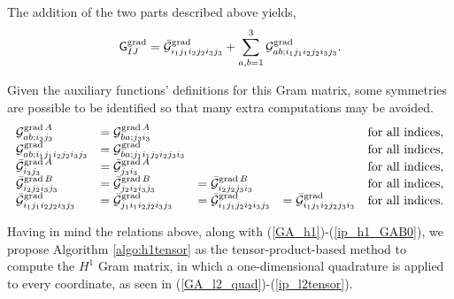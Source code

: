 The addition of the two parts described above yields,
% 
\begin{equation}
    \mathsf{G}^{\operatorname{grad}}_{IJ}=\bar{\mathcal{G}}_{i_1j_1i_2j_2i_3j_3}^{\operatorname{grad}}+\sum\limits_{a,b=1}^3\mathcal{G}_{ab;i_1j_1i_2j_2i_3j_3}^{\operatorname{grad}}.
\end{equation}

Given the auxiliary functions' definitions for this Gram matrix, some symmetries are possible to be identified so that many extra computations may be avoided.
% 
\begin{equation*}
\begin{array}{lllll}
    \mathcal{G}_{ab;i_3j_3}^{\operatorname{grad} A}&=\mathcal{G}_{ba;j_3i_3}^{\operatorname{grad} A}& & &\text{for all indices},\\ 
    \mathcal{G}_{ab;i_1j_1i_2j_2i_3j_3}^{\operatorname{grad}}&=\mathcal{G}_{ba;j_1i_1j_2i_2j_3i_3}^{\operatorname{grad}}& & &\text{for all indices},\\
    \bar{\mathcal{G}}_{i_3j_3}^{\operatorname{grad} A}&=\bar{\mathcal{G}}_{j_3i_3}^{\operatorname{grad} A}& & &\text{for all indices},\\
    \bar{\mathcal{G}}_{i_2j_2i_3j_3}^{\operatorname{grad} B}&=\bar{\mathcal{G}}_{j_2i_2i_3j_3}^{\operatorname{grad} B}&=\bar{\mathcal{G}}_{i_2j_2j_3i_3}^{\operatorname{grad} B}& &\text{for all indices},\\
    \bar{\mathcal{G}}_{i_1j_1i_2j_2i_3j_3}^{\operatorname{grad}}&=\bar{\mathcal{G}}_{j_1i_1i_2j_2i_3j_3}^{\operatorname{grad}}&= \bar{\mathcal{G}}_{i_1j_1j_2i_2i_3j_3}^{\operatorname{grad}}&=\bar{\mathcal{G}}_{i_1j_1i_2j_2j_3i_3}^{\operatorname{grad}} &\text{for all indices}.
\end{array}
\end{equation*}

Having in mind the relations above, along with (\ref{GA_h1})-(\ref{ip_h1_GAB0}), we propose Algorithm \ref{algo:h1tensor} as the tensor-product-based method to compute the $H^1$ Gram matrix, in which a one-dimensional quadrature is applied to every coordinate, as seen in (\ref{GA_l2_quad})-(\ref{ip_l2tensor}). 

